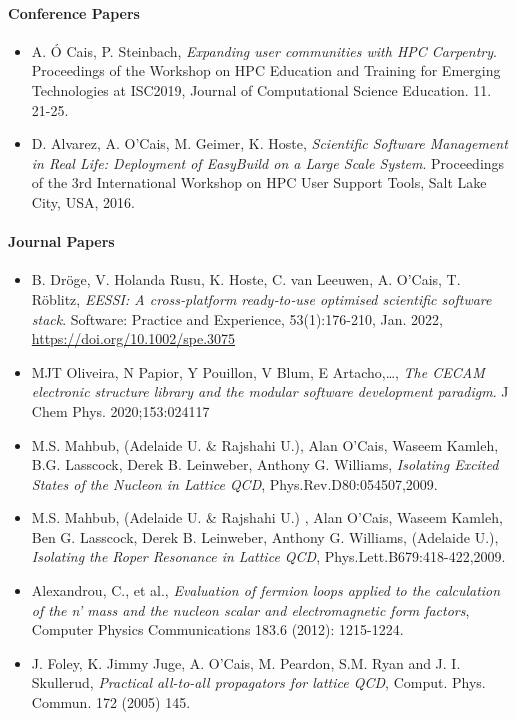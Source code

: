\paragraph{Conference Papers}

\begin{itemize}
\item[] A. \'O Cais, P. Steinbach, \emph{Expanding user communities with HPC Carpentry}. Proceedings of the Workshop on HPC Education and Training for Emerging Technologies at ISC2019, Journal of Computational Science Education. 11. 21-25.
\end{itemize}

\begin{itemize}
\item[] D. Alvarez, A. O'Cais, M. Geimer, K. Hoste, \emph{Scientific Software Management in Real Life: Deployment of EasyBuild on a Large Scale System}. Proceedings of the 3rd International Workshop on HPC User Support Tools, Salt Lake City, USA, 2016.
\end{itemize}

\paragraph{Journal Papers}

\begin{itemize}
\item[] B. Dröge, V. Holanda Rusu, K. Hoste, C. van Leeuwen, A. O'Cais, T. Röblitz, \emph{{EESSI}: {A cross‐platform
    ready‐to‐use optimised scientific software stack}}. Software: Practice and Experience, 53(1):176-210, Jan. 2022,
    \url{https://doi.org/10.1002/spe.3075}
\item[] MJT Oliveira, N Papior, Y Pouillon, V Blum, E Artacho,\dots, \emph{The {CECAM} electronic structure library and the modular software development paradigm}.
  J Chem Phys. 2020;153:024117
\item[] M.S. Mahbub, (Adelaide U. \& Rajshahi U.), Alan O'Cais, Waseem Kamleh, B.G. Lasscock, Derek B. Leinweber, Anthony G. Williams, \emph{Isolating Excited States of the Nucleon in Lattice QCD}, Phys.Rev.D80:054507,2009.
\item[] M.S. Mahbub, (Adelaide U. \& Rajshahi U.) , Alan O'Cais, Waseem Kamleh, Ben G. Lasscock, Derek B. Leinweber, Anthony G. Williams, (Adelaide U.), \emph{Isolating the Roper Resonance in Lattice QCD}, Phys.Lett.B679:418-422,2009.
\item[] Alexandrou, C., et al., \emph{Evaluation of fermion loops applied to the calculation of the n' mass and the nucleon scalar and electromagnetic form factors}, Computer Physics Communications 183.6 (2012): 1215-1224.
\item[] J. Foley, K. Jimmy Juge, A. O'Cais, M. Peardon, S.M. Ryan and J. I. Skullerud, \emph{Practical all-to-all propagators for lattice QCD}, Comput. Phys. Commun. 172 (2005) 145.
\end{itemize}

\newpage
